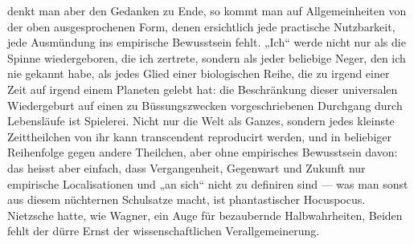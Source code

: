 denkt man aber den Gedanken zu Ende, so kommt man auf Allgemeinheiten von der oben ausgesprochenen Form, denen ersichtlich jede practische Nutzbarkeit, jede Ausmündung ins empirische Bewusstsein fehlt. „Ich“ werde nicht nur als die Spinne wiedergeboren, die ich zertrete, sondern als jeder beliebige Neger, den ich nie gekannt habe, als jedes Glied einer biologischen Reihe, die zu irgend einer Zeit auf irgend einem Planeten gelebt hat: die Beschränkung dieser universalen Wiedergeburt auf einen zu Büssungszwecken vorgeschriebenen Durchgang durch  Lebensläufe ist Spielerei. Nicht nur die Welt als Ganzes, sondern jedes kleinste Zeittheilchen von ihr kann transcendent reproducirt werden, und in beliebiger Reihenfolge gegen andere Theilchen, aber ohne empirisches Bewusstsein davon: das heisst aber einfach, dass Vergangenheit, Gegenwart und Zukunft nur empirische Localisationen und „an sich“ nicht zu definiren sind — was man sonst aus diesem nüchternen Schulsatze macht, ist phantastischer Hocuspocus. Nietzsche hatte, wie Wagner, ein Auge für bezaubernde Halbwahrheiten, Beiden fehlt der dürre Ernst der wissenschaftlichen Verallgemeinerung.
\par

